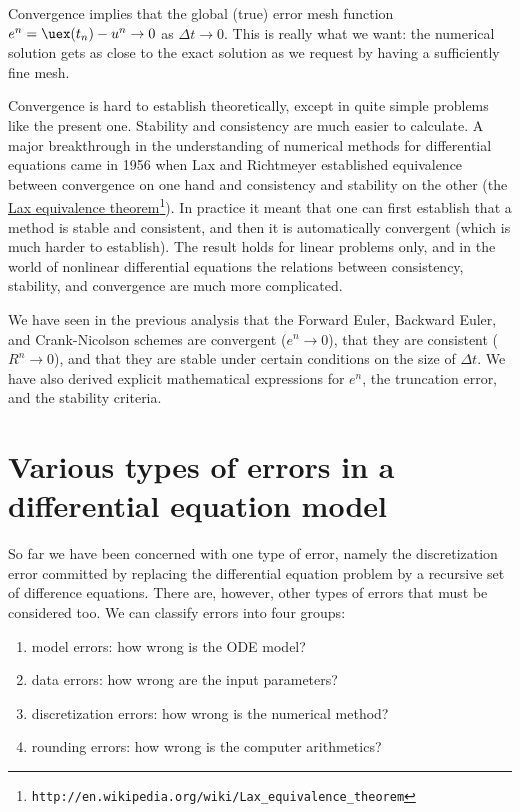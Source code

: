 \documentclass[graybox,sectrefs,envcountresetchap,open=right,final]{svmonodo}
\begin{document}
Convergence implies that the global (true) error mesh function $e^n =
\uex(t_n)-u^n\rightarrow 0$ as $\Delta t\rightarrow 0$. This is really
what we want: the numerical solution gets as close to the exact
solution as we request by having a sufficiently fine mesh.

Convergence is hard to establish theoretically, except in quite simple
problems like the present one. Stability and consistency are much
easier to calculate. A major breakthrough in the understanding of
numerical methods for differential equations came in 1956 when Lax and
Richtmeyer established equivalence between convergence on one hand and
consistency and stability on the other (the \href{{http://en.wikipedia.org/wiki/Lax_equivalence_theorem}}{Lax equivalence theorem}\footnote{\texttt{http://en.wikipedia.org/wiki/Lax\_equivalence\_theorem}}).  In practice
it meant that one can first establish that a method is stable and
consistent, and then it is automatically convergent (which is much
harder to establish).  The result holds for linear problems only, and
in the world of nonlinear differential equations the relations between
consistency, stability, and convergence are much more complicated.

We have seen in the previous analysis that the Forward Euler,
Backward Euler, and Crank-Nicolson schemes are convergent ($e^n\rightarrow 0$),
that they are consistent ($R^n\rightarrow 0$), and that they are
stable under certain conditions on the size of $\Delta t$.
We have also derived explicit mathematical expressions for $e^n$,
the truncation error, and the stability criteria.


\section{Various types of errors in a differential equation model}

So far we have been concerned with one type of error, namely the
discretization error committed by replacing the differential equation
problem by a recursive set of difference equations. There are,
however, other types of errors that must be considered too. We can
classify errors into four groups:

\begin{enumerate}
\item model errors: how wrong is the ODE model?

\item data errors: how wrong are the input parameters?

\item discretization errors: how wrong is the numerical method?

\item rounding errors: how wrong is the computer arithmetics?
\end{enumerate}
\end{document}
